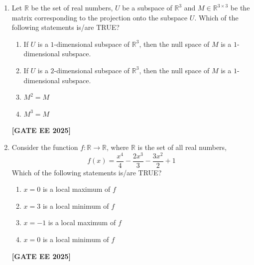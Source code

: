 \documentclass[journal]{IEEEtran}
\newcommand{\qfooter}{%
  \begin{flushright}\footnotesize\textbf{[GATE EE 2025]}\end{flushright}\vspace{1em}%
}
\begin{document}
\begin{enumerate}[leftmargin=*,label=\arabic*.]
\begin{enumerate}[label=(\Alph*)]
\item There exist $M \in \mathbb{R}^{3\times3}$, $p \in \mathbb{R}^3$, and $q \in \mathbb{R}^3$ such that $M\vec{x}=p$ has a unique solution and $M\vec{x}=q$ has infinite solutions.
\item There exist $M \in \mathbb{R}^{3\times3}$, $p \in \mathbb{R}^3$, and $q \in \mathbb{R}^3$ such that $M\vec{x}=p$ has no solutions and $M\vec{x}=q$ has infinite solutions.
\item There exist $M \in \mathbb{R}^{2\times3}$, $p \in \mathbb{R}^2$, and $q \in \mathbb{R}^2$ such that $M\vec{x}=p$ has a unique solution and $M\vec{x}=q$ has infinite solutions.
\item There exist $M \in \mathbb{R}^{3\times2}$, $p \in \mathbb{R}^3$, and $q \in \mathbb{R}^3$ such that $M\vec{x}=p$ has a unique solution and $M\vec{x}=q$ has no solutions.
\end{enumerate} 
\qfooter

\item Let $\mathbb{R}$ be the set of real numbers, $U$ be a subspace of $\mathbb{R}^3$ and $M \in \mathbb{R}^{3\times 3}$ be the matrix corresponding to the projection onto the subspace $U$. Which of the following statements is/are TRUE?

\begin{enumerate}[label=(\Alph*)]
\item If $U$ is a $1$-dimensional subspace of $\mathbb{R}^3$, then the null space of $M$ is a $1$-dimensional subspace.
\item If $U$ is a $2$-dimensional subspace of $\mathbb{R}^3$, then the null space of $M$ is a $1$-dimensional subspace.
\item $M^2 = M$
\item $M^3 = M$
\end{enumerate} 
\qfooter


\item Consider the function $f: \mathbb{R} \to \mathbb{R}$, where $\mathbb{R}$ is the set of all real numbers,
\[
f(x) = \frac{x^4}{4} - \frac{2x^3}{3} - \frac{3x^2}{2} + 1
\]
Which of the following statements is/are TRUE?
\begin{multicols}{2}
\begin{enumerate}[label=(\Alph*)]
\item $x=0$ is a local maximum of $f$
\item $x=3$ is a local minimum of $f$
\item $x=-1$ is a local maximum of $f$
\item $x=0$ is a local minimum of $f$
\end{enumerate} \qfooter
\end{multicols}



\end{enumerate}
\end{document}

